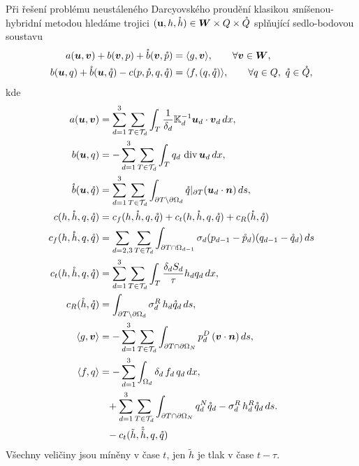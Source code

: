 \documentclass[11pt]{report}
\def\div{\operatorname{div}}
\def\tn#1{{\mathbb{#1}}}    %
\def\vc#1{\mathbf{\boldsymbol{#1}}}     %
\begin{document}
Při řešení problému neustáleného Darcyovského proudění klasikou {\emph 
smíšenou-hybridní metodou} hledáme trojici $(\mathbf{u},h,\mr h)  
\in \vc W\times Q\times\mr Q$ splňující sedlo-bodovou soustavu 
\begin{align}
    a(\vc u,\vc v)  +b(\vc v, p) + \mr b(\vc v, \mr p)
        &=\langle g,\vc v \rangle, \qquad\forall \vc v\in \vc W,
        \label{eq:hybrid-frac-1}\\
    b(\vc u, q ) + \mr b( \vc u, \mr q) - c(p, \mr p, q, \mr q)
        &= \langle f, (q,\mr q) \rangle,
        \qquad\forall q\in Q,\ \mr q\in \mr Q, 
        \label{eq:hybrid-frac-2}
\end{align}
kde 
\begin{align}
    \label{eq:weak_term_a}
    a(\vc u, \vc v) &= \sum_{d=1}^{3}\sum_{T\in \mathcal T_d}
    \int_{T} \frac{1}{\delta_{d}}\tn K_{d}^{-1} 
    \vc u_d\cdot \vc v_d\,dx,
    \\
    \label{eq:weak_term_b}
    b(\vc u, q)  &= -\sum_{d=1}^{3}\sum_{T\in \mathcal T_d}
    \int_{T} q_d\,\div \vc u_d\,dx,
    \\
    \label{eq:weak_term_bf}
    \mr b(\vc u, \mr q)   &= \sum_{d=1}^{3}\sum_{T\in \mathcal T_d}
    \int_{\partial T\setminus\partial\Omega_{d}}
        \mr q|_{\partial T} ( \vc u_d\cdot\vc n)\,ds,
    \\
    \label{eq:weak_term c}
    c(h, \mr h, q, \mr q) &= c_f(h, \mr h, q, \mr q) 
    + c_t(h, \mr h, q, \mr q) + c_R(\mr h, \mr q)
    \\
    c_f(h, \mr h, q, \mr q)&=\sum_{d=2,3}\sum_{T\in \mathcal T_d}
        \int_{\partial T \cap\Omega_{d-1}} \sigma_{d} 
        (p_{d-1} - \mr p_d)(q_{d-1} - \mr q_d)\,ds
    \\
    c_t(h, \mr h, q, \mr q)&= \sum_{d=1}^{3}\sum_{T\in \mathcal T_d}
        \int_{T} \frac{\delta_d S_d}{\tau} h_d q_d\,dx,
    \\    
    c_R(\mr h, \mr q)&=
    \int_{\partial T\setminus\partial\Omega_{d}}
        \sigma_d^R\, h_d \mr q_d \,ds,
    \\
    \langle g, \vc v \rangle  & =
    -\sum_{d=1}^{3}\sum_{T\in\mathcal T_d}
    \int_{\partial T\cap\partial\Omega_N} 
        p_d^D\, (\vc v \cdot \vc n)  \,ds,
    \\
    \langle f, q \rangle  &=
    -\sum_{d=1}^{3}\int_{\Omega_d} \delta_{d}\,f_d\,q_{d}\,dx,
    \\
        &\phantom{=}+
    \sum_{d=1}^{3}\sum_{T\in\mathcal T_d}
    \int_{\partial T\cap\partial\Omega_N} 
        q_d^N \mr q_d - \sigma_d^R\, h_d^R \mr q_d\,ds.
    \\
        &\phantom{=}-c_t(\tilde h, \mr{\tilde{h}}, q, \mr q)
    \label{eq:weak_term_f}%
\end{align}
Všechny veličiny jsou míněny v čase $t$, jen $\tilde h$ je tlak v čase $t-\tau$.
\end{document}
